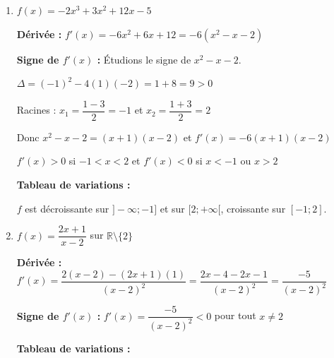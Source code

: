 \documentclass[1,DS,p,e,prof]{phBook}
\begin{document}
\begin{exercice}
\begin{correction}
\begin{enumerate}
            \item $f(x)=-2x^3+3x^2+12x-5$
            
            \textbf{Dérivée :} $f'(x)=-6x^2+6x+12=-6(x^2-x-2)$
            
            \textbf{Signe de $f'(x)$ :} Étudions le signe de $x^2-x-2$.
            
            $\Delta = (-1)^2-4(1)(-2)=1+8=9>0$
            
            Racines : $x_1=\dfrac{1-3}{2}=-1$ et $x_2=\dfrac{1+3}{2}=2$
            
            Donc $x^2-x-2=(x+1)(x-2)$ et $f'(x)=-6(x+1)(x-2)$
            
            $f'(x)>0$ si $-1<x<2$ et $f'(x)<0$ si $x<-1$ ou $x>2$
            
            \textbf{Tableau de variations :}
            \begin{center}
            \end{center}
            
            $f$ est décroissante sur $]-\infty;-1]$ et sur $[2;+\infty[$, croissante sur $[-1;2]$.
            
            \item $f(x)=\dfrac{2x+1}{x-2}$ sur $\mathbb{R}\setminus\{2\}$
            
            \textbf{Dérivée :} $f'(x)=\dfrac{2(x-2)-(2x+1)(1)}{(x-2)^2}=\dfrac{2x-4-2x-1}{(x-2)^2}=\dfrac{-5}{(x-2)^2}$
            
            \textbf{Signe de $f'(x)$ :} $f'(x)=\dfrac{-5}{(x-2)^2}<0$ pour tout $x \neq 2$
            
            \textbf{Tableau de variations :}
            \begin{center}
            \end{center}
            

\end{enumerate}
\end{correction}
\end{exercice}
\end{document}

